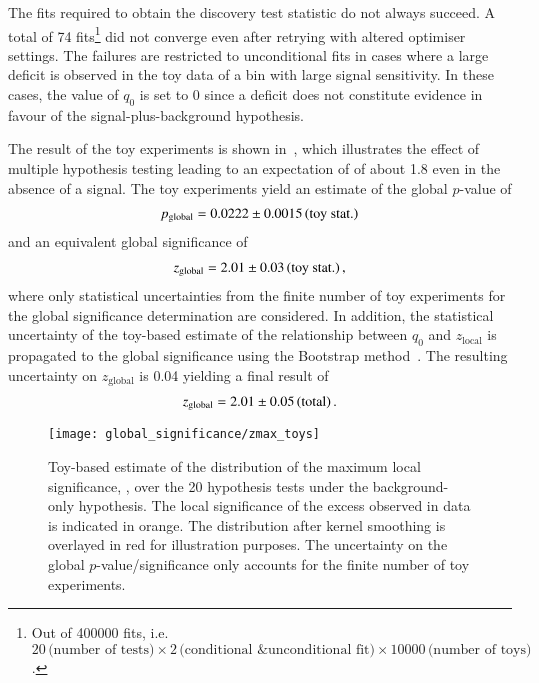 The fits required to obtain the discovery test statistic do not always
succeed. A total of \num{74} fits\footnote{Out of \num{400000} fits, i.e.\
  $20\,\text{(number of tests)} \times 2\,\text{(conditional \& unconditional
    fit)} \times \num{10000}\,\text{(number of toys)}$.}  did not converge even
after retrying with altered optimiser settings. The failures are restricted to
unconditional fits in cases where a large deficit is observed in the toy data of
a bin with large signal sensitivity. In these cases, the value of $q_0$ is set
to 0 since a deficit does not constitute evidence in favour of the
signal-plus-background hypothesis.

The result of the toy experiments is shown in~, which
illustrates the effect of multiple hypothesis testing leading to an expectation
of \Zmaxlocal of about \num{1.8} even in the absence of a signal. The toy
experiments yield an estimate of the global $p$-value of
\begin{align*}
  \pglobal = \num{0.0222}\numerrt{0.0015}{toy stat.}
\end{align*}
and an equivalent global significance of
\begin{align*}
  \zglobal = \num{2.01}\numerrt{0.03}{toy stat.} \,\text{,}
\end{align*}
where only statistical uncertainties from the finite number of toy experiments
for the global significance determination are considered. In addition, the
statistical uncertainty of the toy-based estimate of the relationship between
$q_0$ and $z_{\text{local}}$ is propagated to the global significance using the
Bootstrap method~\cite{10.1214/aos/1176344552,efron1994introduction}. The
resulting uncertainty on $z_{\text{global}}$ is \num{0.04} yielding a final
result of
\begin{align*}
  \zglobal = \num{2.01}\numerrt{0.05}{total} \,\text{.}
\end{align*}

\begin{figure}[htbp]
  \centering

  \texttt{[image: global\_significance/zmax\_toys]}

  \caption{Toy-based estimate of the distribution of the maximum local
    significance, \Zmaxlocal, over the 20 hypothesis tests under the
    background-only hypothesis. The local significance of the excess observed in
    data is indicated in orange. The distribution after kernel smoothing is
    overlayed in red for illustration purposes. The uncertainty on the global
    $p$-value/significance only accounts for the finite number of toy
    experiments.}%
  \label{fig:zmax_toys}
\end{figure}

